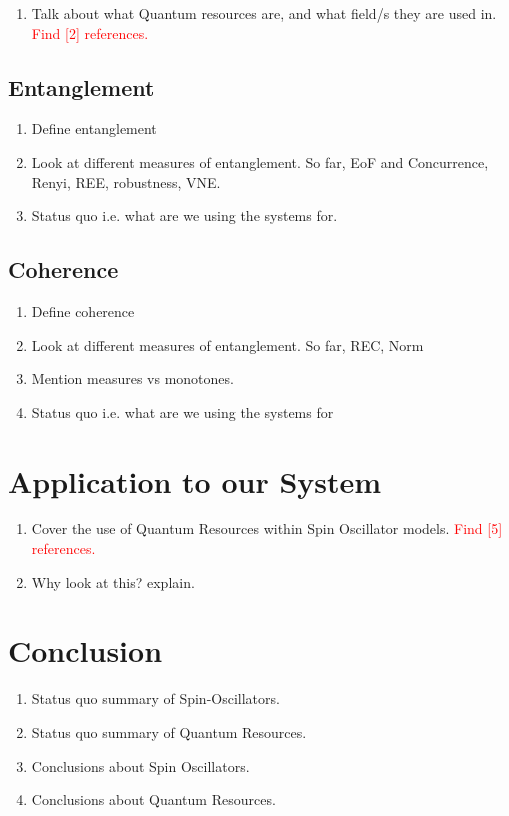 \documentclass{article}
\begin{document}
\begin{enumerate}
    \item Talk about what Quantum resources are, and what field/s they are used in. \textcolor{red}{Find [2] references.}
\end{enumerate}

\subsection{Entanglement}
\begin{enumerate}
    \item Define entanglement
    \item Look at different measures of entanglement. So far, EoF and Concurrence, Renyi, REE, robustness, VNE.
    \item Status quo i.e. what are we using the systems for.
\end{enumerate}

\subsection{Coherence}
\begin{enumerate}
    \item Define coherence 
    \item Look at different measures of entanglement. So far, REC, Norm 
    \item Mention measures vs monotones.
    \item Status quo i.e. what are we using the systems for
\end{enumerate}

\section{Application to our System}
\begin{enumerate}
    \item Cover the use of Quantum Resources within Spin Oscillator models. \textcolor{red}{Find [5] references.}
    \item Why look at this? explain. 
\end{enumerate}

\section{Conclusion}
\begin{enumerate}
    \item Status quo summary of Spin-Oscillators.
    \item Status quo summary of Quantum Resources. 
    \item Conclusions about Spin Oscillators.
    \item Conclusions about Quantum Resources.
\end{enumerate}
\end{document}
